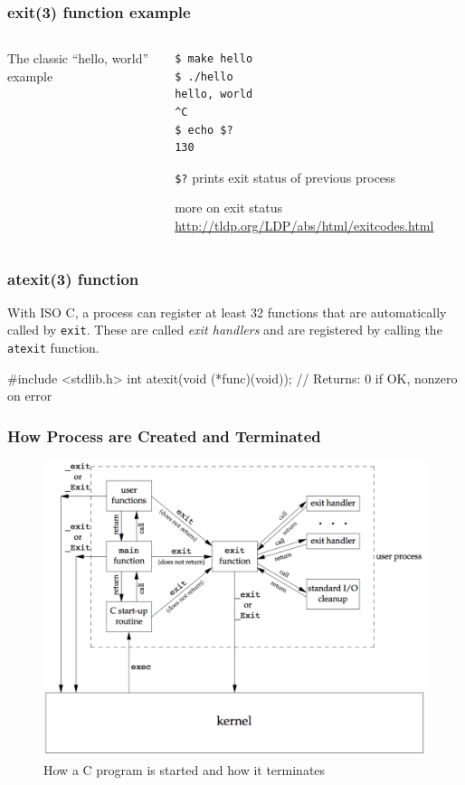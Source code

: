 \documentclass[newPxFont,sthlmFooter,nooffset]{beamer}
\begin{document}
\begin{frame}[containsverbatim,t]
  \frametitle{exit(3) function example}
\bigskip
  \begin{columns}
    \begin{column}{0.45\linewidth}
      The classic ``hello, world'' example
      
    \end{column}
    \begin{column}{0.5\linewidth}
\begin{verbatim}
$ make hello
$ ./hello
hello, world
^C
$ echo $?
130
\end{verbatim}
\texttt{\$?} prints exit status of previous process

      more on exit status
      \url{http://tldp.org/LDP/abs/html/exitcodes.html}
    \end{column}
  \end{columns}
\end{frame}

\begin{frame}[containsverbatim,t]
  \frametitle{atexit(3) function}
With ISO C, a process can register at least 32 functions that are automatically called by
\texttt{exit}. These are called \textit{exit handlers} and are registered by calling the \texttt{atexit} function.

\begin{codedef}
#include <stdlib.h>
int atexit(void (*func)(void));
// Returns: 0 if OK, nonzero on error
\end{codedef}


\end{frame}


\begin{frame}[t]
  \frametitle{How Process are Created and Terminated}

\begin{figure}[h]
  \centering
  \includegraphics[height=0.85\textheight]{figure/fig7-2_how_prog.png}
  \caption{How a C program is started and how it terminates}
\end{figure}
\end{frame}
\end{document}
